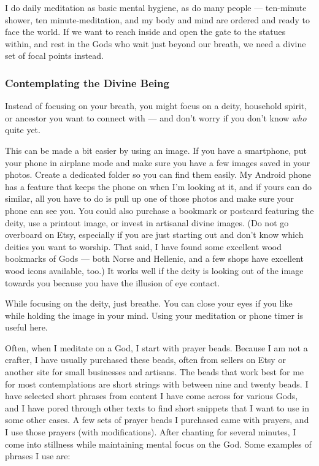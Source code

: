 \documentclass[
]{book}
\begin{document}
I do daily meditation as basic mental hygiene, as do many people --- ten-minute shower, ten minute-meditation, and my body and mind are ordered and ready to face the world. If we want to reach inside and open the gate to the statues within, and rest in the Gods who wait just beyond our breath, we need a divine set of focal points instead.

\hypertarget{contemplating-the-divine-being}{%
\subsubsection{Contemplating the Divine Being}\label{contemplating-the-divine-being}}

Instead of focusing on your breath, you might focus on a deity, household spirit, or ancestor you want to connect with --- and don't worry if you don't know \emph{who} quite yet.

This can be made a bit easier by using an image. If you have a smartphone, put your phone in airplane mode and make sure you have a few images saved in your photos. Create a dedicated folder so you can find them easily. My Android phone has a feature that keeps the phone on when I'm looking at it, and if yours can do similar, all you have to do is pull up one of those photos and make sure your phone can see you. You could also purchase a bookmark or postcard featuring the deity, use a printout image, or invest in artisanal divine images. (Do not go overboard on Etsy, especially if you are just starting out and don't know which deities you want to worship. That said, I have found some excellent wood bookmarks of Gods --- both Norse and Hellenic, and a few shops have excellent wood icons available, too.) It works well if the deity is looking out of the image towards you because you have the illusion of eye contact.

While focusing on the deity, just breathe. You can close your eyes if you like while holding the image in your mind. Using your meditation or phone timer is useful here.

Often, when I meditate on a God, I start with prayer beads. Because I am not a crafter, I have usually purchased these beads, often from sellers on Etsy or another site for small businesses and artisans. The beads that work best for me for most contemplations are short strings with between nine and twenty beads. I have selected short phrases from content I have come across for various Gods, and I have pored through other texts to find short snippets that I want to use in some other cases. A few sets of prayer beads I purchased came with prayers, and I use those prayers (with modifications). After chanting for several minutes, I come into stillness while maintaining mental focus on the God. Some examples of phrases I use are:
\end{document}
